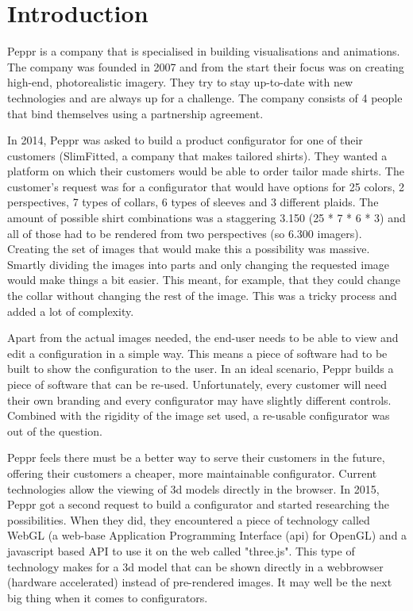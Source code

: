 \chapter{Introduction}

Peppr is a company that is specialised in building visualisations and animations. The company was founded in 2007 and from the start their focus was on creating high-end, photorealistic imagery. They try to stay up-to-date with new technologies and are always up for a challenge. The company consists of 4 people that bind themselves using a partnership agreement.

In 2014, Peppr was asked to build a product configurator for one of their customers (SlimFitted, a company that makes tailored shirts). They wanted a platform on which their customers would be able to order tailor made shirts. The customer's request was for a configurator that would have options for 25 colors, 2 perspectives, 7 types of collars, 6 types of sleeves and 3 different plaids. The amount of possible shirt combinations was a staggering 3.150 (25 * 7 * 6 * 3) and all of those had to be rendered from two perspectives (so 6.300 imagers). Creating the set of images that would make this a possibility was massive. Smartly dividing the images into parts and only changing the requested image would make things a bit easier. This meant, for example, that they could change the collar without changing the rest of the image. This was a tricky process and added a lot of complexity.

Apart from the actual images needed, the end-user needs to be able to view and edit a configuration in a simple way. This means a piece of software had to be built to show the configuration to the user. In an ideal scenario, Peppr builds a piece of software that can be re-used. Unfortunately, every customer will need their own branding and every configurator may have slightly different controls. Combined with the rigidity of the image set used, a re-usable configurator was out of the question.

Peppr feels there must be a better way to serve their customers in the future, offering their customers a cheaper, more maintainable configurator. Current technologies allow the viewing of 3d models directly in the browser. In 2015, Peppr got a second request to build a configurator and started researching the possibilities. When they did, they encountered a piece of technology called WebGL (a web-base Application Programming Interface (api) for OpenGL) and a javascript based API to use it on the web called "three.js". This type of technology makes for a 3d model that can be shown directly in a webbrowser (hardware accelerated) instead of pre-rendered images. It may well be the next big thing when it comes to configurators.

